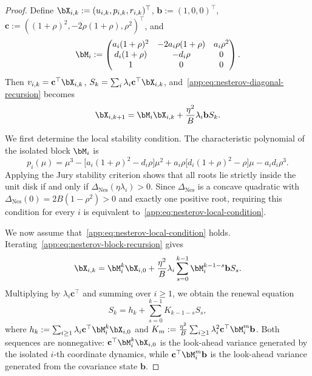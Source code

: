 \begin{proof}
Define \(\bX_{i,k}:=(u_{i,k},p_{i,k},r_{i,k})^\top\), \(\mathbf b:=(1,0,0)^\top\), \(\mathbf c:=((1+\rho)^2,-2\rho(1+\rho),\rho^2)^\top\), and
\[
\bM_i:=\begin{pmatrix}
a_i(1+\rho)^2&-2a_i\rho(1+\rho)&a_i\rho^2\\
d_i(1+\rho)&-d_i\rho&0\\
1&0&0
\end{pmatrix}.
\]
Then \(v_{i,k}=\mathbf c^\top\bX_{i,k}\), \(S_k=\sum_i\lambda_i\mathbf c^\top\bX_{i,k}\), and~\eqref{app:eq:nesterov-diagonal-recursion} becomes
\begin{equation}
\label{app:eq:nesterov-block-recursion}
\bX_{i,k+1}=\bM_i\bX_{i,k}+\frac{\eta^2}{B}\lambda_i\mathbf bS_k.
\end{equation}

We first determine the local stability condition. The characteristic polynomial of the isolated block \(\bM_i\) is
\[
p_i(\mu)=\mu^3-\big[a_i(1+\rho)^2-d_i\rho\big]\mu^2+a_i\rho\big[d_i(1+\rho)^2-\rho\big]\mu-a_id_i\rho^3.
\]
Applying the Jury stability criterion shows that all roots lie strictly inside the unit disk if and only if \(\Delta_{\mathrm{Nes}}(\eta\lambda_i)>0\). Since \(\Delta_{\mathrm{Nes}}\) is a concave quadratic with \(\Delta_{\mathrm{Nes}}(0)=2B(1-\rho^2)>0\) and exactly one positive root, requiring this condition for every \(i\) is equivalent to~\eqref{app:eq:nesterov-local-condition}.

We now assume that~\eqref{app:eq:nesterov-local-condition} holds. Iterating~\eqref{app:eq:nesterov-block-recursion} gives
\[
\bX_{i,k}=\bM_i^k\bX_{i,0}+\frac{\eta^2}{B}\lambda_i\sum_{s=0}^{k-1}\bM_i^{k-1-s}\mathbf bS_s.
\]
Multiplying by \(\lambda_i\mathbf c^\top\) and summing over \(i\geq1\), we obtain the renewal equation
\begin{equation}
\label{app:eq:nesterov-renewal}
S_k=h_k+\sum_{s=0}^{k-1}K_{k-1-s}S_s,
\end{equation}
where \(h_k:=\sum_{i\geq1}\lambda_i\mathbf c^\top\bM_i^k\bX_{i,0}\) and \(K_m:=\frac{\eta^2}{B}\sum_{i\geq1}\lambda_i^2\mathbf c^\top\bM_i^m\mathbf b\). Both sequences are nonnegative: \(\mathbf c^\top\bM_i^k\bX_{i,0}\) is the look-ahead variance generated by the isolated \(i\)-th coordinate dynamics, while \(\mathbf c^\top\bM_i^m\mathbf b\) is the look-ahead variance generated from the covariance state \(\mathbf b\).


\end{proof}

